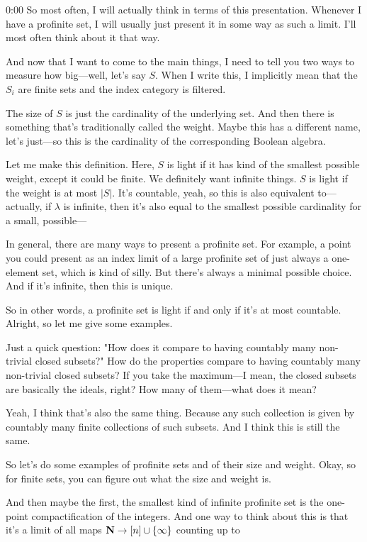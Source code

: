 \begin{unfinished}{0:00}
So most often, I will actually think in terms of this presentation. Whenever I have a profinite set, I will usually just present it in some way as such a limit. I'll most often think about it that way.

And now that I want to come to the main things, I need to tell you two ways to measure how big---well, let's say $S$. When I write this, I implicitly mean that the $S_i$ are finite sets and the index category is filtered.

The size of $S$ is just the cardinality of the underlying set. And then there is something that's traditionally called the weight. Maybe this has a different name, let's just---so this is the cardinality of the corresponding Boolean algebra.

Let me make this definition. Here, $S$ is light if it has kind of the smallest possible weight, except it could be finite. We definitely want infinite things. $S$ is light if the weight is at most $| S |$. It's countable, yeah, so this is also equivalent to--- actually, if $\lambda$ is infinite, then it's also equal to the smallest possible cardinality for a small, possible---

In general, there are many ways to present a profinite set. For example, a point you could present as an index limit of a large profinite set of just always a one-element set, which is kind of silly. But there's always a minimal possible choice. And if it's infinite, then this is unique.

So in other words, a profinite set is light if and only if it's at most countable. Alright, so let me give some examples.

Just a quick question: "How does it compare to having countably many non-trivial closed subsets?" How do the properties compare to having countably many non-trivial closed subsets? If you take the maximum---I mean, the closed subsets are basically the ideals, right? How many of them---what does it mean?

Yeah, I think that's also the same thing. Because any such collection is given by countably many finite collections of such subsets. And I think this is still the same.

So let's do some examples of profinite sets and of their size and weight. Okay, so for finite sets, you can figure out what the size and weight is.

And then maybe the first, the smallest kind of infinite profinite set is the one-point compactification of the integers. And one way to think about this is that it's a limit of all maps $\mathbf N \to [n] \cup \{\infty\}$ counting up to 


\end{unfinished}
